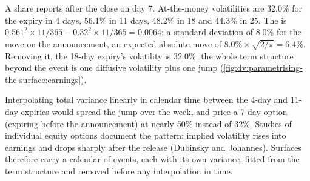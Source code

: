 \begin{example}\label{ex:dv:parametrising-the-surface:earnings}
A share reports after the close on day 7. At-the-money volatilities are 32.0\% for the expiry in 4
days, 56.1\% in 11 days, 48.2\% in 18 and 44.3\% in 25. The  is
$0.561^2\times11/365-0.32^2\times11/365=0.0064$: a standard deviation of 8.0\% for the move on the
announcement, an expected absolute move of $8.0\%\times\sqrt{2/\pi}=6.4\%$. Removing it, the
18-day expiry's volatility is 32.0\%: the whole term structure beyond the event is one diffusive
volatility plus one jump (\cref{fig:dv:parametrising-the-surface:earnings}).
\end{example}

Interpolating total variance linearly in calendar time between the 4-day and 11-day expiries would
spread the jump over the week, and price a 7-day option (expiring before the announcement) at
nearly 50\% instead of 32\%. Studies of individual equity options document the pattern: implied
volatility rises into earnings and drops sharply after the release (Dubinsky and Johannes). Surfaces
therefore carry a calendar of events, each with its own variance, fitted from the term structure
and removed before any interpolation in time.

\begin{omfigure}

\label{fig:dv:parametrising-the-surface:earnings}
\end{omfigure}

